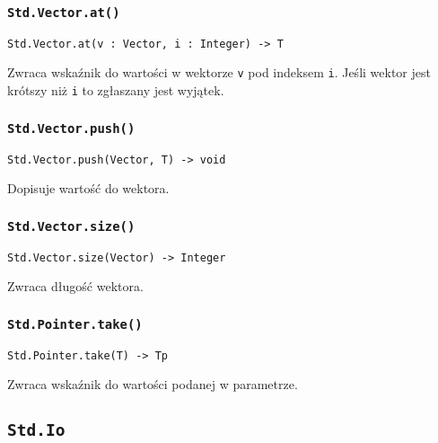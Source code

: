 \subsubsection{\texttt{Std.Vector.at()}}

\begin{small}
\begin{lstlisting}
Std.Vector.at(v : Vector, i : Integer) -> T
\end{lstlisting}
\end{small}

Zwraca wskaźnik do wartości w wektorze \texttt{v} pod indeksem \texttt{i}. Jeśli
wektor jest krótszy niż \texttt{i} to zgłaszany jest wyjątek.

\subsubsection{\texttt{Std.Vector.push()}}

\begin{small}
\begin{lstlisting}
Std.Vector.push(Vector, T) -> void
\end{lstlisting}
\end{small}

Dopisuje wartość do wektora.

\subsubsection{\texttt{Std.Vector.size()}}

\begin{small}
\begin{lstlisting}
Std.Vector.size(Vector) -> Integer
\end{lstlisting}
\end{small}

Zwraca długość wektora.

\subsubsection{\texttt{Std.Pointer.take()}}

\begin{small}
\begin{lstlisting}
Std.Pointer.take(T) -> Tp
\end{lstlisting}
\end{small}

Zwraca wskaźnik do wartości podanej w parametrze.

\subsection{\texttt{Std.Io}}
\label{stdlib_Std_Io}

